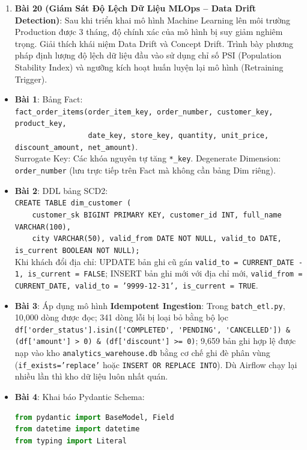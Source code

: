\begin{baitapbox}
\begin{enumerate}
    \item \textbf{Bài 20 (Giám Sát Độ Lệch Dữ Liệu MLOps -- Data Drift Detection)}: Sau khi triển khai mô hình Machine Learning lên môi trường Production được 3 tháng, độ chính xác của mô hình bị suy giảm nghiêm trọng. Giải thích khái niệm Data Drift và Concept Drift. Trình bày phương pháp định lượng độ lệch dữ liệu đầu vào sử dụng chỉ số PSI (Population Stability Index) và ngưỡng kích hoạt huấn luyện lại mô hình (Retraining Trigger).
\end{enumerate}
\end{baitapbox}

\begin{dapanbox}
\begin{itemize}
    \item \textbf{Bài 1}: Bảng Fact:\\
    \lstinline|fact_order_items(order_item_key, order_number, customer_key, product_key,|\\
    \lstinline|                 date_key, store_key, quantity, unit_price, discount_amount, net_amount)|.\\
    Surrogate Key: Các khóa nguyên tự tăng \texttt{*\_key}. Degenerate Dimension: \texttt{order\_number} (lưu trực tiếp trên Fact mà không cần bảng Dim riêng).
    \item \textbf{Bài 2}: DDL bảng SCD2:\\
    \lstinline|CREATE TABLE dim_customer (|\\
    \lstinline|    customer_sk BIGINT PRIMARY KEY, customer_id INT, full_name VARCHAR(100),|\\
    \lstinline|    city VARCHAR(50), valid_from DATE NOT NULL, valid_to DATE, is_current BOOLEAN NOT NULL);|\\
    Khi khách đổi địa chỉ: UPDATE bản ghi cũ gán \texttt{valid\_to = CURRENT\_DATE - 1, is\_current = FALSE}; INSERT bản ghi mới với địa chỉ mới, \texttt{valid\_from = CURRENT\_DATE, valid\_to = '9999-12-31', is\_current = TRUE}.
    \item \textbf{Bài 3}: Áp dụng mô hình \textbf{Idempotent Ingestion}: Trong \texttt{batch\_etl.py}, 10,000 dòng được đọc; 341 dòng lỗi bị loại bỏ bằng bộ lọc \lstinline|df['order_status'].isin(['COMPLETED', 'PENDING', 'CANCELLED']) & (df['amount'] > 0) & (df['discount'] >= 0)|; 9,659 bản ghi hợp lệ được nạp vào kho \texttt{analytics\_warehouse.db} bằng cơ chế ghi đè phân vùng (\texttt{if\_exists='replace'} hoặc \texttt{INSERT OR REPLACE INTO}). Dù Airflow chạy lại nhiều lần thì kho dữ liệu luôn nhất quán.
    \item \textbf{Bài 4}: Khai báo Pydantic Schema:
    \begin{lstlisting}[language=python]
from pydantic import BaseModel, Field
from datetime import datetime
from typing import Literal


\end{lstlisting}
\end{itemize}
\end{dapanbox}
